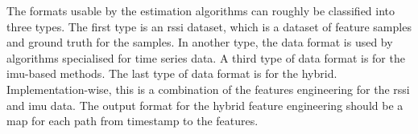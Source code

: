 The formats usable by the estimation algorithms can roughly be classified into three types. The first type is an \gls{rssi} dataset, which is a dataset of feature samples and ground truth for the samples. In another type, the data format is used by algorithms specialised for time series data. A third type of data format is for the \gls{imu}-based methods. The last type of data format is for the hybrid. Implementation-wise, this is a combination of the features engineering for the \gls{rssi} and \gls{imu} data. The output format for the hybrid feature engineering should be a map for each path from timestamp to the features.


